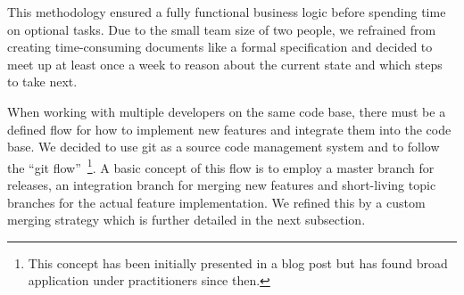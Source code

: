This methodology ensured a fully functional business logic before spending time on optional tasks.
Due to the small team size of two people, we refrained from creating time-consuming documents like a formal specification and decided to meet up at least once a week to reason about the current state and which steps to take next.

When working with multiple developers on the same code base, there must be a defined flow for how to implement new features and integrate them into the code base.
We decided to use git as a source code management system and to follow the \enquote{git flow}~\footnote{This concept has been initially presented in a blog post \cite{gitflow} but has found broad application under practitioners since then.}.
A basic concept of this flow is to employ a master branch for releases, an integration branch for merging new features and short-living topic branches for the actual feature implementation.
We refined this by a custom merging strategy which is further detailed in the next subsection.

